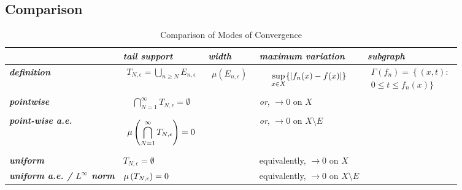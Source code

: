 \documentclass[11pt]{article}
\begin{document}
\subsection{Comparison}
\begin{table}[h!]
\setlength{\abovedisplayskip}{0pt}
\setlength{\belowdisplayskip}{-10pt}
\setlength{\abovedisplayshortskip}{0pt}
\setlength{\belowdisplayshortskip}{0pt}
\footnotesize
\centering
\caption{Comparison of Modes of Convergence}
\label{tab: convergence}
\renewcommand\tabularxcolumn[1]{m{#1}}
\small
\begin{tabularx}{1\textwidth} { 
  | >{\raggedright\arraybackslash} m{2cm}
  | >{\centering\arraybackslash}X
  | >{\centering\arraybackslash}X
  | >{\centering\arraybackslash}X
  | >{\centering\arraybackslash}X  | }
 \hline
 &    \emph{\textbf{tail support}} & \emph{\textbf{width}} & \emph{\textbf{maximum variation}} & \emph{\textbf{subgraph}}\\
 \hline 
 \emph{\textbf{definition}}& 
 \begin{align*}
 T_{N,\epsilon} =\bigcup_{n \ge N}E_{n,\epsilon}
\end{align*} &  
\begin{align*}
\mu(E_{n,\epsilon})
\end{align*}
& 
\begin{align*}
\sup_{x \in X}\{\left\lvert f_n(x) - f(x) \right\rvert\}
\end{align*}
&
\begin{align*}
\Gamma(f_{n}) =\left\{(x,t): \right.\\
\left. 0\le t \le f_n(x)\}\right.
\end{align*} 
 \\
 \hline
 \emph{\textbf{pointwise}}  & 
  \begin{align*}
 \bigcap_{N=1}^{\infty}T_{N,\epsilon} = \emptyset
\end{align*}
& & \emph{or}, $\rightarrow 0$ on $X$ &   \\
\hline
 \emph{\textbf{point-wise a.e.}}   & 
  \begin{align*}
 \mu\left(\bigcap_{N=1}^{\infty}T_{N,\epsilon}\right) = 0
\end{align*}
& &  \emph{or}, $\rightarrow 0$ on $X \setminus E$ &  \\
\hline
\emph{\textbf{uniform}}  & $T_{N,\epsilon} = \emptyset$ & & 
 equivalently, $\rightarrow 0$ on $X$ & \\
\hline
\emph{\textbf{uniform a.e. / $L^{\infty}$ norm}}  & $\mu\left(T_{N,\epsilon}\right) =0$ & & 
equivalently, $\rightarrow 0$ on $X \setminus E$  & \\

\end{tabularx}
\end{table}
\end{document}
